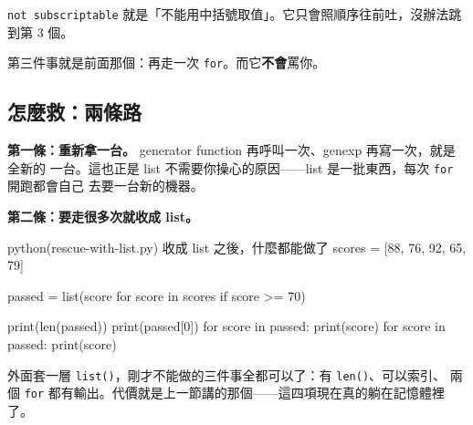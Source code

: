 \texttt{not subscriptable} 就是「不能用中括號取值」。它只會照順序往前吐，沒辦法跳到第 3 個。

第三件事就是前面那個：再走一次 \texttt{for}。而它\textbf{不會}罵你。


\subsection*{怎麼救：兩條路}

\textbf{第一條：重新拿一台。} generator function 再呼叫一次、genexp 再寫一次，就是全新的
一台。這也正是 list 不需要你操心的原因——list 是一批東西，每次 \texttt{for} 開跑都會自己
去要一台新的機器。

\textbf{第二條：要走很多次就收成 list。}

\begin{example}{python}{(rescue-with-list.py) 收成 list 之後，什麼都能做了}
scores = [88, 76, 92, 65, 79]

passed = list(score for score in scores if score >= 70)

print(len(passed))
print(passed[0])
for score in passed:
    print(score)
for score in passed:
    print(score)
\end{example}


外面套一層 \texttt{list()}，剛才不能做的三件事全都可以了：有 \texttt{len()}、可以索引、
兩個 \texttt{for} 都有輸出。代價就是上一節講的那個——這四項現在真的躺在記憶體裡了。


